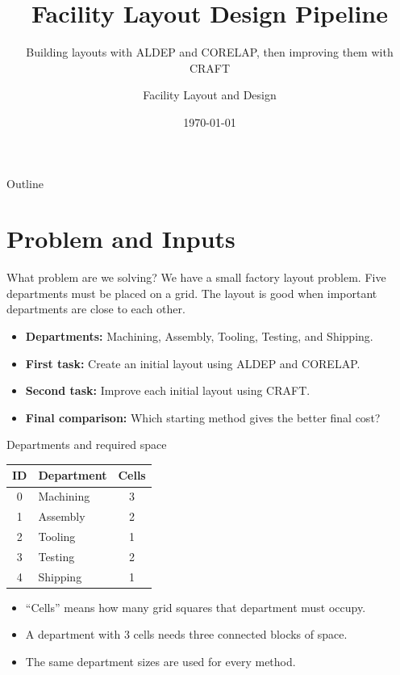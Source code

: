 \documentclass[aspectratio=169,10pt]{beamer}
\title[FLD Project]{Facility Layout Design Pipeline}
\subtitle{Building layouts with ALDEP and CORELAP, then improving them with CRAFT}
\author{Facility Layout and Design}
\date{\today}
\begin{document}
\begin{frame}
  \titlepage
\end{frame}

\begin{frame}{Outline}
  \tableofcontents
\end{frame}

\section{Problem and Inputs}

\begin{frame}[t]{What problem are we solving?}
  \RaggedRight
  \small
  We have a small factory layout problem. Five departments must be placed on a grid.
  The layout is good when important departments are close to each other.

  \vspace{0.55em}
  \begin{itemize}
    \setlength{\itemsep}{0.35em}
    \item \textbf{Departments:} Machining, Assembly, Tooling, Testing, and Shipping.
    \item \textbf{First task:} Create an initial layout using ALDEP and CORELAP.
    \item \textbf{Second task:} Improve each initial layout using CRAFT.
    \item \textbf{Final comparison:} Which starting method gives the better final cost?
  \end{itemize}
\end{frame}

\begin{frame}[t]{Departments and required space}
  \centering
  \small
  \begin{tabular}{@{}clc@{}}
    \toprule
    ID & Department & Cells \\
    \midrule
    0 & Machining  & 3 \\
    1 & Assembly   & 2 \\
    2 & Tooling    & 1 \\
    3 & Testing    & 2 \\
    4 & Shipping   & 1 \\
    \bottomrule
  \end{tabular}

  \vspace{0.55em}
  \RaggedRight
  \small
  \begin{itemize}
    \setlength{\itemsep}{0.35em}
    \item ``Cells'' means how many grid squares that department must occupy.
    \item A department with 3 cells needs three connected blocks of space.
    \item The same department sizes are used for every method.
  \end{itemize}
\end{frame}
\end{document}
